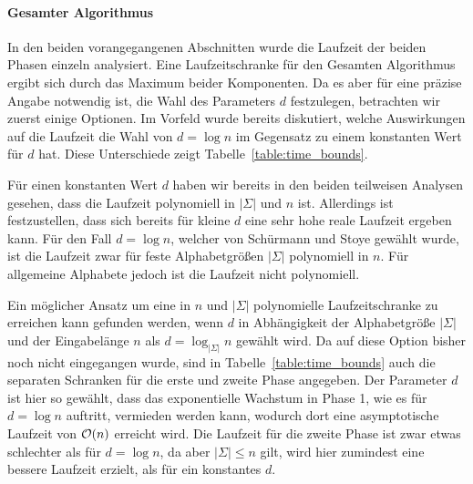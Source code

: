 \paragraph*{Gesamter Algorithmus}
In den beiden vorangegangenen Abschnitten wurde die Laufzeit der beiden Phasen einzeln analysiert. Eine Laufzeitschranke für den Gesamten Algorithmus ergibt sich durch das Maximum beider Komponenten. Da es aber für eine präzise Angabe notwendig ist, die Wahl des Parameters \(d\) festzulegen, betrachten wir zuerst einige Optionen. Im Vorfeld wurde bereits diskutiert, welche Auswirkungen auf die Laufzeit die Wahl von \(d = \log n\) im Gegensatz zu einem konstanten Wert für \(d\) hat. Diese Unterschiede zeigt Tabelle~\ref{table:time_bounds}.
\begin{table}[h]
	\centering
    \vspace{1ex}
    \caption{Laufzeitschranken für \bpr in Abhängigkeit von \(d\)}
    \label{table:time_bounds}
\end{table}
Für einen konstanten Wert \(d\) haben wir bereits in den beiden teilweisen Analysen gesehen, dass die Laufzeit polynomiell in \(|\Sigma|\) und \(n\) ist. Allerdings ist festzustellen, dass sich bereits für kleine \(d\) eine sehr hohe reale Laufzeit ergeben kann. Für den Fall \(d = \log n\), welcher von Schürmann und Stoye gewählt wurde, ist die Laufzeit zwar für feste Alphabetgrößen \(|\Sigma|\) polynomiell in \(n\). Für allgemeine Alphabete jedoch ist die Laufzeit nicht polynomiell.\par
Ein möglicher Ansatz um eine in \(n\) und \(|\Sigma|\) polynomielle Laufzeitschranke zu erreichen kann gefunden werden, wenn \(d\) in Abhängigkeit der Alphabetgröße \(|\Sigma|\) und der Eingabelänge \(n\) als \(d = \log_{|\Sigma|} n\) gewählt wird. Da auf diese Option bisher noch nicht eingegangen wurde, sind in Tabelle~\ref{table:time_bounds} auch die separaten Schranken für die erste und zweite Phase angegeben. Der Parameter \(d\) ist hier so gewählt, dass das exponentielle Wachstum in Phase 1, wie es für \(d = \log n\) auftritt, vermieden werden kann, wodurch dort eine asymptotische Laufzeit von \(\mathcal{O}(n)\) erreicht wird. Die Laufzeit für die zweite Phase ist zwar etwas schlechter als für \(d = \log n\), da aber \(|\Sigma| \leq n\) gilt, wird hier zumindest eine bessere Laufzeit erzielt, als für ein konstantes \(d\).
